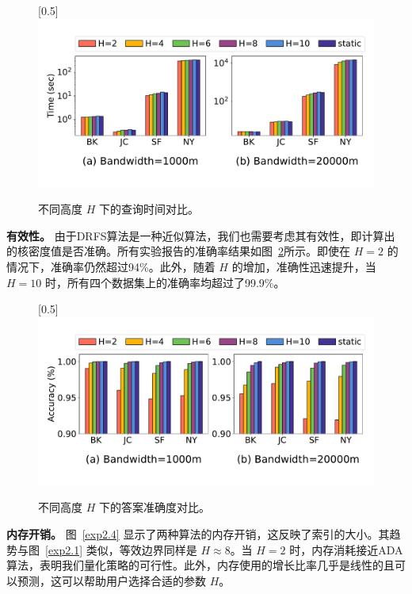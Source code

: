 \begin{figure}[h]\centering
	\vspace{-1em}
	\scalebox{0.5}[0.5]{\includegraphics{./figures/EXP_H_RunningTime.pdf}}
	\vspace{-1em}
	\caption{不同高度 $H$ 下的查询时间对比。}
	\label{exp2.2}
\end{figure}

\textbf{有效性。} 由于DRFS算法是一种近似算法，我们也需要考虑其有效性，即计算出的核密度值是否准确。所有实验报告的准确率结果如图~\ref{exp2.3}所示。即使在 $H=2$ 的情况下，准确率仍然超过94\%。此外，随着 $H$ 的增加，准确性迅速提升，当 $H=10$ 时，所有四个数据集上的准确率均超过了99.9\%。

\begin{figure}[h]\centering
	\scalebox{0.5}[0.5]{\includegraphics{./figures/EXP_H_Accuracy.pdf}}
	\vspace{-1em}
	\caption{不同高度 $H$ 下的答案准确度对比。}
	\label{exp2.3}
\end{figure}

\textbf{内存开销。}  图~\ref{exp2.4} 显示了两种算法的内存开销，这反映了索引的大小。其趋势与图~\ref{exp2.1} 类似，等效边界同样是 $H \approx 8$。当 $H=2$ 时，内存消耗接近ADA算法，表明我们量化策略的可行性。此外，内存使用的增长比率几乎是线性的且可以预测，这可以帮助用户选择合适的参数 $H$。

